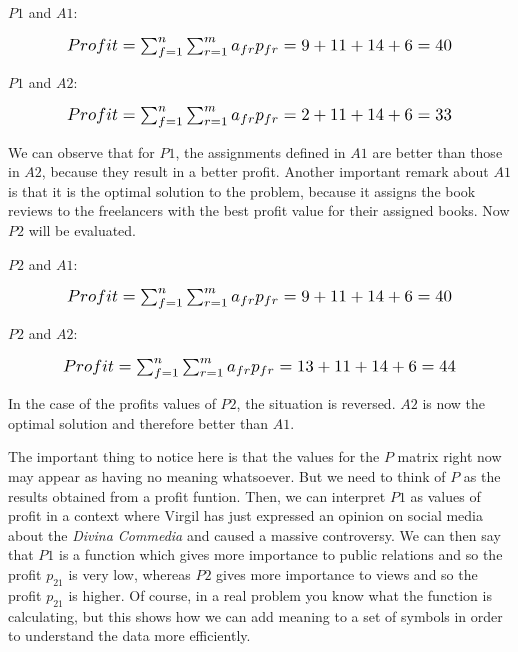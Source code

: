 $P1$ and $A1$:

\begin{equation}
    \scalebox{1.2}{$Profit = \sum_{f=1}^n \sum_{r=1}^m a_{fr} p_{fr} = 9 + 11 + 14 + 6 = 40$}
\end{equation}

$P1$ and $A2$:

\begin{equation}
    \scalebox{1.2}{$Profit = \sum_{f=1}^n \sum_{r=1}^m a_{fr} p_{fr} = 2 + 11 + 14 + 6 = 33$}
\end{equation}

We can observe that for $P1$, the assignments defined in $A1$ are better than those in $A2$, because they result in a better profit. Another important remark about $A1$ is that it is the optimal solution to the problem, because it assigns the book reviews to the freelancers with the best profit value for their assigned books. Now $P2$ will be evaluated.

$P2$ and $A1$:

\begin{equation}
    \scalebox{1.2}{$Profit = \sum_{f=1}^n \sum_{r=1}^m a_{fr} p_{fr} = 9 + 11 + 14 + 6  = 40$}
\end{equation}

$P2$ and $A2$:

\begin{equation}
    \scalebox{1.2}{$Profit = \sum_{f=1}^n \sum_{r=1}^m a_{fr} p_{fr} = 13 + 11 + 14 + 6 = 44$}
\end{equation}

In the case of the profits values of $P2$, the situation is reversed. $A2$ is now the optimal solution and therefore better than $A1$.

The important thing to notice here is that the values for the $P$ matrix right now may appear as having no meaning whatsoever. But we need to think of $P$ as the results obtained from a profit funtion. Then, we can interpret $P1$ as values of profit in a context where Virgil has just expressed an opinion on social media about the \textit{Divina Commedia} and caused a massive controversy. We can then say that $P1$ is a function which gives more importance to public relations and so the profit $p_{21}$ is very low, whereas $P2$ gives more importance to views and so the profit $p_{21}$ is higher. Of course, in a real problem you know what the function is calculating, but this shows how we can add meaning to a set of symbols in order to understand the data more efficiently.

